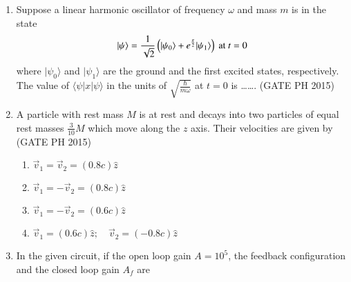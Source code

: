 \documentclass[journal]{IEEEtran}
\begin{document}
\begin{enumerate}
\item

Suppose a linear harmonic oscillator of frequency \( \omega \) and mass \( m \) is in the state
\[
\vert{\psi}\rangle = \frac{1}{\sqrt{2}} \left( \vert{\psi_0}\rangle + e^{\frac{\pi}{2}} \vert{\psi_1}\rangle \right) \text{ at } t = 0
\]
where \( \vert{\psi_0}\rangle \) and \( \vert{\psi_1}\rangle \) are the ground and the first excited states, respectively. The value of \( \langle{\psi | x | \psi}\rangle \) in the units of \( \sqrt{\frac{\hbar}{m \omega}} \) at \( t = 0 \) is \ldots\ldots. \hfill (GATE PH 2015)

\item A particle with rest mass \( M \) is at rest and decays into two particles of equal rest masses \( \frac{3}{10} M \) which move along the \( z \) axis. Their velocities are given by \hfill (GATE PH 2015)

\begin{multicols}{2}
    \begin{enumerate}
        \item \( \vec{v}_1 = \vec{v}_2 = (0.8c) \hat{z} \)
        \item \( \vec{v}_1 = -\vec{v}_2 = (0.8c) \hat{z} \)
        \item \( \vec{v}_1 = -\vec{v}_2 = (0.6c) \hat{z} \)
        \item \( \vec{v}_1 = (0.6c) \hat{z}; \quad \vec{v}_2 = (-0.8c) \hat{z} \)
    \end{enumerate}
\end{multicols}

\item In the given circuit, if the open loop gain \( A = 10^5 \), the feedback configuration and the closed loop gain \( A_f \) are

\begin{center}
\end{center}
\end{enumerate}
\end{document}
